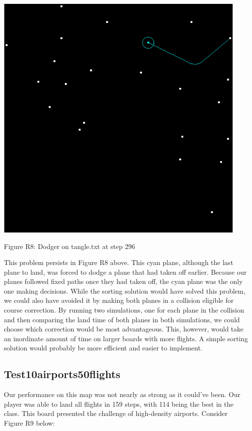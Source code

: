 \documentclass[10pt]{article}
\begin{document}
\includegraphics[width=125mm]{pics/R8.png}
\caption{Figure R8: Dodger on tangle.txt at step 296}

This problem persists in Figure R8 above. This cyan plane, although the last plane to land, was forced to dodge a plane that had taken off earlier. Because our planes followed fixed paths once they had taken off, the cyan plane was the only one making decisions. While the sorting solution would have solved this problem, we could also have avoided it by making both planes in a collision eligible for course correction. By running two simulations, one for each plane in the collision and then comparing the land time of both planes in both simulations, we could choose which correction would be most advantageous. This, however, would take an inordinate amount of time on larger boards with more flights. A simple sorting solution would probably be more efficient and easier to implement.

\subsection{Test10airports50flights}

Our performance on this map was not nearly as strong as it could’ve been. Our player was able to land all flights in 159 steps, with 114 being the best in the class. This board presented the challenge of high-density airports. Consider Figure R9 below:
\end{document}
